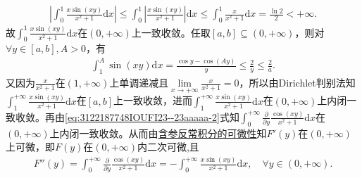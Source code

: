 \documentclass[../../main.tex]{subfiles}%
\begin{document}
\begin{solution}
\begin{enumerate}[(1)]
\begin{align*}
\left| \int_{0}^{1} \frac{x\sin(xy)}{x^2+1} \mathrm{d}x \right|
\leqslant \int_{0}^{1} \left| \frac{x\sin(xy)}{x^2+1} \right| \mathrm{d}x
\leqslant \int_{0}^{1} \frac{x}{x^2+1} \mathrm{d}x
= \frac{\ln 2}{2} < +\infty.
\end{align*}
故$\int_{0}^{1} \frac{x\sin(xy)}{x^2+1} \mathrm{d}x$在$(0,+\infty)$上一致收敛。任取$[a,b] \subseteq (0,+\infty)$，则对$\forall y\in[a,b], A>0$，有
\begin{align*}
\int_{1}^{A} \sin(xy) \mathrm{d}x
= \frac{\cos y - \cos(Ay)}{y}
\leqslant \frac{2}{y}
\leqslant \frac{2}{a}.
\end{align*}
又因为$\frac{x}{x^2+1}$在$(1,+\infty)$上单调递减且$\lim\limits_{x\rightarrow+\infty} \frac{x}{x^2+1} = 0$，所以由Dirichlet判别法知$\int_{1}^{+\infty} \frac{x\sin(xy)}{x^2+1} \mathrm{d}x$在$[a,b]$上一致收敛，进而$\int_{1}^{+\infty} \frac{x\sin(xy)}{x^2+1} \mathrm{d}x$在$(0,+\infty)$上内闭一致收敛。再由\eqref{eq:3122187748IOUFI23--23aaaaa-2}式知$\int_{0}^{+\infty} \frac{\partial}{\partial y} \frac{\cos(xy)}{x^2+1} \mathrm{d}x$在$(0,+\infty)$上内闭一致收敛。从而由\hyperref[theorem:含参反常积分的可微性]{含参反常积分的可微性}知$F'(y)$在$(0,+\infty)$上可微，即$F(y)$在$(0,+\infty)$内二次可微,且
\begin{align}\label{eq::::HIUUUUUUU342424523}
F'' \left( y \right) =\int_0^{+\infty}{\frac{\partial}{\partial y}\frac{\cos \left( xy \right)}{x^2+1}\mathrm{d}x}=-\int_0^{+\infty}{\frac{x\sin \left( xy \right)}{x^2+1}\mathrm{d}x},\quad \forall y\in \left( 0,+\infty \right) .
\end{align}


\end{enumerate}
\end{solution}
\end{document}

